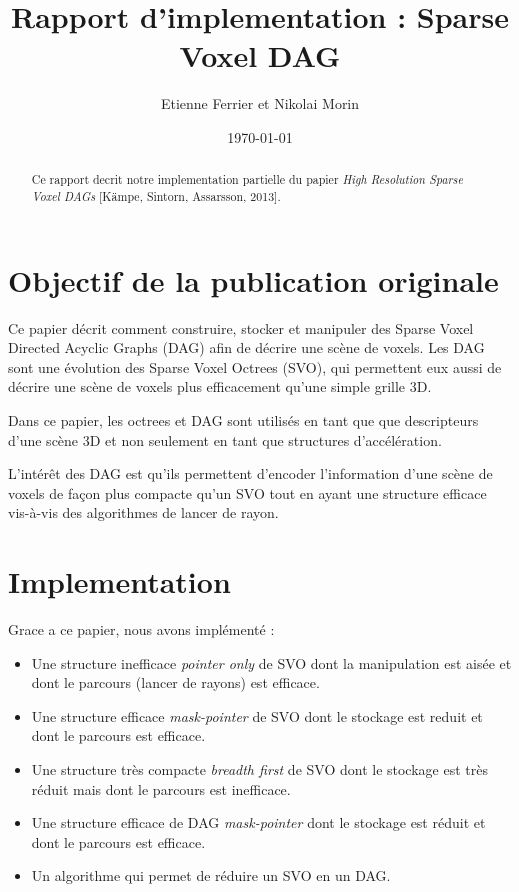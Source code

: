 \documentclass[a4paper]{article}
\title{Rapport d'implementation : Sparse Voxel DAG}
\author{Etienne Ferrier et Nikolai Morin}
\date{\today}
\begin{document}
\maketitle

\begin{abstract}
Ce rapport decrit notre implementation partielle du papier \textit{High Resolution Sparse Voxel DAGs} [Kämpe, Sintorn, Assarsson, 2013].
\end{abstract}

\section{Objectif de la publication originale}

Ce papier décrit comment construire, stocker et manipuler des Sparse Voxel Directed Acyclic Graphs (DAG) afin de décrire une scène de voxels. Les DAG sont une évolution des Sparse Voxel Octrees (SVO), qui permettent eux aussi de décrire une scène de voxels plus efficacement qu’une simple grille 3D.

Dans ce papier, les octrees et DAG sont utilisés en tant que que descripteurs d’une scène 3D et non seulement en tant que structures d’accélération.

L’intérêt des DAG est qu’ils permettent d’encoder l’information d'une scène de voxels de façon plus compacte qu’un SVO tout en ayant une structure efficace vis-à-vis des algorithmes de lancer de rayon.


\section{Implementation}

Grace a ce papier, nous avons implémenté :\\

\begin{itemize}
  \item Une structure inefficace \textit{pointer only} de SVO dont la manipulation est aisée et dont le parcours (lancer de rayons) est efficace.
  \item Une structure efficace \textit{mask-pointer} de SVO dont le stockage est reduit et dont le parcours est efficace.
  \item Une structure très compacte \textit{breadth first} de SVO dont le stockage est très réduit mais dont le parcours est inefficace.
  \item Une structure efficace de DAG \textit{mask-pointer} dont le stockage est réduit et dont le parcours est efficace.
  \item Un algorithme qui permet de réduire un SVO en un DAG.\\
\end{itemize}
\end{document}
